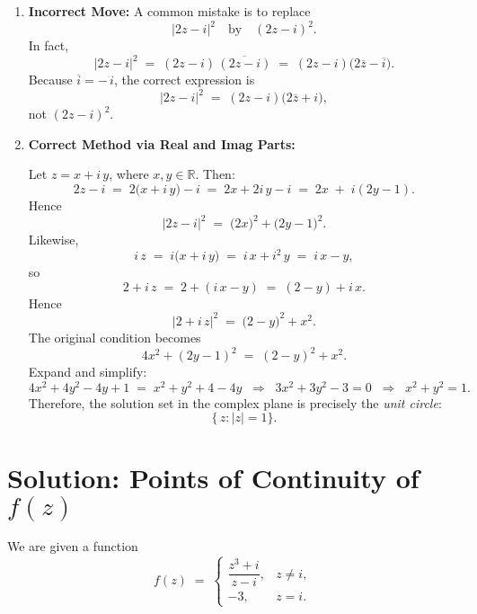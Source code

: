 \documentclass[12pt]{article}
\theoremstyle{definition} %
\theoremstyle{plain} %
\begin{document}
    \begin{enumerate}
    \item \textbf{Incorrect Move:}  
      A common mistake is to replace
      \[
        \bigl\lvert 2z - i\bigr\rvert^2
        \quad\text{by}\quad
        (2z - i)^2.
      \]
      In fact,
      \[
        \bigl\lvert 2z - i\bigr\rvert^2
        \;=\;(2z - i)\,\overline{(2z - i)}
        \;=\;(2z - i)\bigl(2\overline{z} - \overline{i}\bigr).
      \]
      Because $\overline{i} = -\,i$, the correct expression is
      \[
        \bigl\lvert 2z - i\bigr\rvert^2 
        \;=\;
        (2z - i)\bigl(2\overline{z} + i\bigr),
      \]
      not $(2z - i)^2$.
    
    \item \textbf{Correct Method via Real and Imag Parts:}
    
      Let $z = x + i\,y$, where $x,y\in\mathbb{R}$. Then:
      \[
        2z - i 
        \;=\; 2\bigl(x + i\,y\bigr) - i
        \;=\; 2x + 2i\,y - i
        \;=\; 2x \;+\; i(2y - 1).
      \]
      Hence
      \[
        \bigl\lvert 2z - i \bigr\rvert^2
        \;=\; \bigl(2x\bigr)^2 + \bigl(2y - 1\bigr)^2.
      \]
      Likewise,
      \[
        i\,z 
        \;=\; i\bigl(x + i\,y\bigr) 
        \;=\; i\,x + i^2\,y 
        \;=\; i\,x - y,
      \]
      so
      \[
        2 + i\,z 
        \;=\; 2 + (i\,x - y)
        \;=\; (2 - y) + i\,x.
      \]
      Hence
      \[
        \bigl\lvert 2 + i\,z \bigr\rvert^2
        \;=\;\bigl(2 - y\bigr)^2 + x^2.
      \]
      The original condition becomes
      \[
        4x^2 + (2y - 1)^2 
        \;=\; (2 - y)^2 + x^2.
      \]
      Expand and simplify:
      \[
        4x^2 + 4y^2 - 4y + 1 
        \;=\; x^2 + y^2 + 4 - 4y
        \;\;\Longrightarrow\;\;
        3x^2 + 3y^2 - 3 = 0
        \;\;\Longrightarrow\;\;
        x^2 + y^2 = 1.
      \]
      Therefore, the solution set in the complex plane is precisely the \emph{unit circle}:
      \[
        \bigl\{\,z : |z| = 1 \bigr\}.
      \]

    \end{enumerate}

    \section*{Solution: Points of Continuity of \texorpdfstring{$f(z)$}{f(z)}}

    We are given a function
    \[
    f(z) \;=\;
    \begin{cases}
    \dfrac{z^3 + i}{\,z - i\,}, & z \neq i,\\[6pt]
    -3, & z = i.
    \end{cases}
    \]
    
\end{document}
